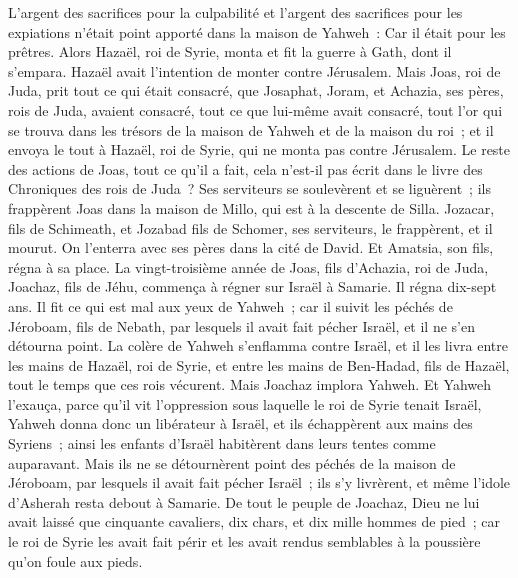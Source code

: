 \begin{multicols}{2}
L'argent des sacrifices pour la culpabilité et l'argent des sacrifices pour les expiations n'était point apporté dans la maison de Yahweh~: Car il était pour les prêtres.
Alors Hazaël, roi de Syrie, monta et fit la guerre à Gath, dont il s'empara. Hazaël avait l'intention de monter contre Jérusalem.
Mais Joas, roi de Juda, prit tout ce qui était consacré, que Josaphat, Joram, et Achazia, ses pères, rois de Juda, avaient consacré, tout ce que lui-même avait consacré, tout l'or qui se trouva dans les trésors de la maison de Yahweh et de la maison du roi~; et il envoya le tout à Hazaël, roi de Syrie, qui ne monta pas contre Jérusalem.
Le reste des actions de Joas, tout ce qu'il a fait, cela n'est-il pas écrit dans le livre des Chroniques des rois de Juda~?
Ses serviteurs se soulevèrent et se liguèrent~; ils frappèrent Joas dans la maison de Millo, qui est à la descente de Silla.
Jozacar, fils de Schimeath, et Jozabad fils de Schomer, ses serviteurs, le frappèrent, et il mourut. On l'enterra avec ses pères dans la cité de David. Et Amatsia, son fils, régna à sa place.
\VerseOne{}La vingt-troisième année de Joas, fils d'Achazia, roi de Juda, Joachaz, fils de Jéhu, commença à régner sur Israël à Samarie. Il régna dix-sept ans.
Il fit ce qui est mal aux yeux de Yahweh~; car il suivit les péchés de Jéroboam, fils de Nebath, par lesquels il avait fait pécher Israël, et il ne s'en détourna point.
La colère de Yahweh s'enflamma contre Israël, et il les livra entre les mains de Hazaël, roi de Syrie, et entre les mains de Ben-Hadad, fils de Hazaël, tout le temps que ces rois vécurent.
Mais Joachaz implora Yahweh. Et Yahweh l'exauça, parce qu'il vit l'oppression sous laquelle le roi de Syrie tenait Israël,
Yahweh donna donc un libérateur à Israël, et ils échappèrent aux mains des Syriens~; ainsi les enfants d'Israël habitèrent dans leurs tentes comme auparavant.
Mais ils ne se détournèrent point des péchés de la maison de Jéroboam, par lesquels il avait fait pécher Israël~; ils s'y livrèrent, et même l'idole d'Asherah resta debout à Samarie.
De tout le peuple de Joachaz, Dieu ne lui avait laissé que cinquante cavaliers, dix chars, et dix mille hommes de pied~; car le roi de Syrie les avait fait périr et les avait rendus semblables à la poussière qu'on foule aux pieds.

\end{multicols}

